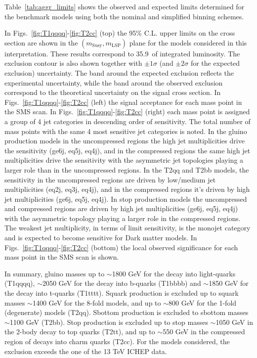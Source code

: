 Table~\ref{tab:aggr_limits} shows the observed and expected limits
determined for the benchmark models using both the nominal and
simplified binning schemes. 

In Figs.~\ref{fig:T1qqqq}-\ref{fig:T2cc} (top) the 95\% C.L. upper
limits on the cross section are shown in the
$(m_{\mathrm{Susy}},m_{\mathrm{LSP}})$ plane for the models considered
in this interpretation. These results correspond to 35.9~\ifb of
integrated luminosity. The exclusion contour is also shown together
with $\pm1\sigma$ (and $\pm2\sigma$ for the expected exclusion)
uncertainty.  The band around the expected exclusion reflects the
experimental uncertainty, while the band around the observed exclusion
correspond to the theoretical uncertainty on the signal cross
section. In Figs.~\ref{fig:T1qqqq}-\ref{fig:T2cc} (left) the signal
acceptance for each mass point in the SMS scan. In
Figs.~\ref{fig:T1qqqq}-\ref{fig:T2cc} (right) each mass point is
assigned a group of 4 jet categories in descending order of
sensitivity. The total number of mass points with the same 4 most
sensitive jet categories is noted. In the gluino production models in
the uncompressed regions the high jet multiplicities drive the
sensitivity (ge6j, eq5j, eq4j), and in the compressed regions the same
high jet multiplicities drive the sensitivity with the asymmetric jet
topologies playing a larger role than in the uncompressed regions. In
the T2qq and T2bb models, the sensitivity in the uncompressed regions
are driven by low/medium jet multiplicities (eq2j, eq3j, eq4j), and in
the compressed regions it's driven by high jet multiplicities (ge6j,
eq5j, eq4j). In stop production models the uncompressed and compressed
regions are driven by high jet multiplicities (ge6j, eq5j, eq4j) with
the asymmetric topology playing a larger role in the compressed
regions.  The weakest jet multiplicity, in terms of limit sensitivity,
is the monojet category and is expected to become sensitive for Dark
matter models. In Figs.~\ref{fig:T1qqqq}-\ref{fig:T2cc} (bottom) the
local observed significance for each mass point in the SMS scan is
shown.

In summary, gluino masses up to $\sim$1800 GeV for the decay into
light-quarks (T1qqqq), $\sim$2050 GeV for the decay into b-quarks
(T1bbbb) and $\sim$1850 GeV for the decay into t-quarks
(T1tttt). Squark production is excluded up to squark masses $\sim$1400
GeV for the 8-fold models, and up to $\sim$800 GeV for the 1-fold
(degenerate) models (T2qq). Sbottom production is excluded to sbottom
masses $\sim$1100 GeV (T2bb).  Stop production is excluded up to stop
masses $\sim$1050 GeV in the 2-body decay to top quarks (T2tt), and up
to $\sim$550 GeV in the compressed region of decays into charm quarks
(T2cc).  For the models considered, the exclusion exceeds the one of
the 13 TeV ICHEP data.

